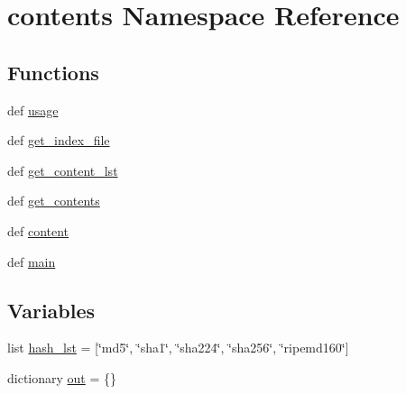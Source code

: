 \hypertarget{namespacecontents}{\section{contents Namespace Reference}
\label{namespacecontents}
}
\subsection*{Functions}
\begin{DoxyCompactItemize}
\item 
def \hyperlink{namespacecontents_ae25089e2431a22d6b2a68d095506b088}{usage}
\item 
def \hyperlink{namespacecontents_a11621d3183af1f16d43e337d6f714a6d}{get\-\_\-index\-\_\-file}
\item 
def \hyperlink{namespacecontents_acf1adaf56932b978273262f8bb6e8cf8}{get\-\_\-content\-\_\-lst}
\item 
def \hyperlink{namespacecontents_a8c034aa19abfd0e12b41983eed38becd}{get\-\_\-contents}
\item 
def \hyperlink{namespacecontents_ac43dcaf9f2f48493bad051895b4b2f26}{content}
\item 
def \hyperlink{namespacecontents_a527d96ac9b0aaf410d4e30bd835f6621}{main}
\end{DoxyCompactItemize}
\subsection*{Variables}
\begin{DoxyCompactItemize}
\item 
list \hyperlink{namespacecontents_a58d7b4d85a0c40154a4a7e54d2792eaa}{hash\-\_\-lst} = \mbox{[}\char`\"{}md5\char`\"{}, \char`\"{}sha1\char`\"{}, \char`\"{}sha224\char`\"{}, \char`\"{}sha256\char`\"{}, \char`\"{}ripemd160\char`\"{}\mbox{]}
\item 
dictionary \hyperlink{namespacecontents_a8e827de11bb89d2bda09930f841b3765}{out} = \{\}
\end{DoxyCompactItemize}


